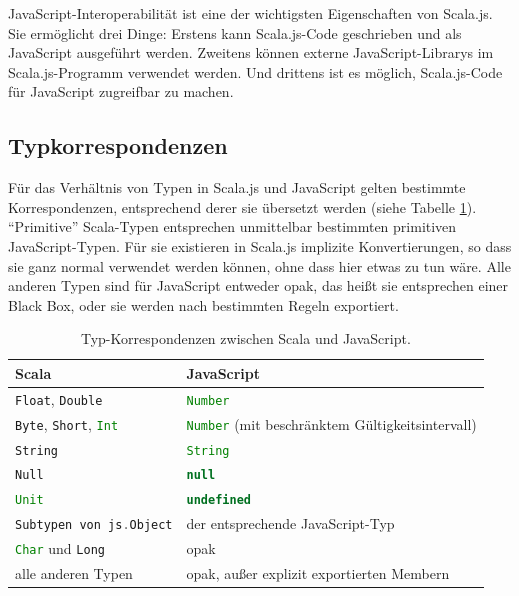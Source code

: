 \documentclass[a4paper, 12pt, hidelinks, listof=totoc, listoftables=totoc, bibliography=totoc]{scrreprt}
\newcommand{\scala}[1]{\lstinline[language=Scala, style=inline]|#1|}
\newcommand{\js}[1]{\lstinline[language=JavaScript, style=inline]|#1|}
\begin{document}
JavaScript-Interoperabilität ist eine der wichtigsten Eigenschaften von Scala.js. Sie ermöglicht drei Dinge: Erstens kann Scala.js-Code geschrieben und als JavaScript ausgeführt werden. Zweitens können externe JavaScript-Librarys im Scala.js-Programm verwendet werden. Und drittens ist es möglich, Scala.js-Code für JavaScript zugreifbar zu machen.

\subsection{Typkorrespondenzen}

Für das Verhältnis von Typen in Scala.js und JavaScript gelten bestimmte Korrespondenzen, entsprechend derer sie übersetzt werden (siehe Tabelle \ref{table:type-correspondance}). "`Primitive"' Scala-Typen entsprechen unmittelbar bestimmten primitiven JavaScript-Typen. Für sie existieren in Scala.js implizite Konvertierungen, so dass sie ganz normal verwendet werden können, ohne dass hier etwas zu tun wäre. Alle anderen Typen sind für JavaScript entweder opak, das heißt sie entsprechen einer Black Box, oder sie werden nach bestimmten Regeln exportiert.

\begin{table}[!h]
\begin{tabular}{|l|l|}
\hline \textbf{Scala}                           & \textbf{JavaScript} \\ 
\hline \scala{Float}, \scala{Double}            & \js{Number} \\ 
\hline \scala{Byte}, \scala{Short}, \scala{Int} & \js{Number} (mit beschränktem Gültigkeitsintervall) \\ 
\hline \scala{String}                           & \js{String} \\ 
\hline \scala{Null}                             & \js{null} \\ 
\hline \scala{Unit}                             & \js{undefined} \\ 
\hline \scala{Subtypen von js.Object}           & der entsprechende JavaScript-Typ \\ 
\hline \scala{Char} und \scala{Long}            & opak \\ 
\hline alle anderen Typen                       & opak, außer explizit exportierten Membern \\ 
\hline 
\end{tabular}
\caption[Typ-Korrespondenzen zwischen Scala und JavaScript.]{Typ-Korrespondenzen zwischen Scala und JavaScript. \cite[S. 13]{doeraene2014.WHB}}
\label{table:type-correspondance}
\end{table}
\end{document}
